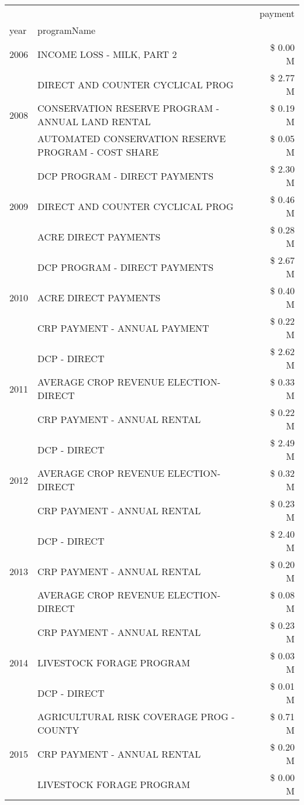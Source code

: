 \begin{tabular}{llr}
\toprule
 &  & payment \\
year & programName &  \\
\midrule
2006 & INCOME LOSS - MILK, PART 2 & \$ 0.00 M \\
\cline{1-3}
\multirow[t]{3}{*}{2008} & DIRECT AND COUNTER CYCLICAL PROG & \$ 2.77 M \\
 & CONSERVATION RESERVE PROGRAM - ANNUAL LAND RENTAL & \$ 0.19 M \\
 & AUTOMATED CONSERVATION RESERVE PROGRAM - COST SHARE & \$ 0.05 M \\
\cline{1-3}
\multirow[t]{3}{*}{2009} & DCP PROGRAM - DIRECT PAYMENTS & \$ 2.30 M \\
 & DIRECT AND COUNTER CYCLICAL PROG & \$ 0.46 M \\
 & ACRE DIRECT PAYMENTS & \$ 0.28 M \\
\cline{1-3}
\multirow[t]{3}{*}{2010} & DCP PROGRAM - DIRECT PAYMENTS & \$ 2.67 M \\
 & ACRE DIRECT PAYMENTS & \$ 0.40 M \\
 & CRP PAYMENT - ANNUAL PAYMENT & \$ 0.22 M \\
\cline{1-3}
\multirow[t]{3}{*}{2011} & DCP - DIRECT & \$ 2.62 M \\
 & AVERAGE CROP REVENUE ELECTION-DIRECT & \$ 0.33 M \\
 & CRP PAYMENT - ANNUAL RENTAL & \$ 0.22 M \\
\cline{1-3}
\multirow[t]{3}{*}{2012} & DCP - DIRECT & \$ 2.49 M \\
 & AVERAGE CROP REVENUE ELECTION-DIRECT & \$ 0.32 M \\
 & CRP PAYMENT - ANNUAL RENTAL & \$ 0.23 M \\
\cline{1-3}
\multirow[t]{3}{*}{2013} & DCP - DIRECT & \$ 2.40 M \\
 & CRP PAYMENT - ANNUAL RENTAL & \$ 0.20 M \\
 & AVERAGE CROP REVENUE ELECTION-DIRECT & \$ 0.08 M \\
\cline{1-3}
\multirow[t]{3}{*}{2014} & CRP PAYMENT - ANNUAL RENTAL & \$ 0.23 M \\
 & LIVESTOCK FORAGE PROGRAM & \$ 0.03 M \\
 & DCP - DIRECT & \$ 0.01 M \\
\cline{1-3}
\multirow[t]{3}{*}{2015} & AGRICULTURAL RISK COVERAGE PROG - COUNTY & \$ 0.71 M \\
 & CRP PAYMENT - ANNUAL RENTAL & \$ 0.20 M \\
 & LIVESTOCK FORAGE PROGRAM & \$ 0.00 M \\

\end{tabular}
